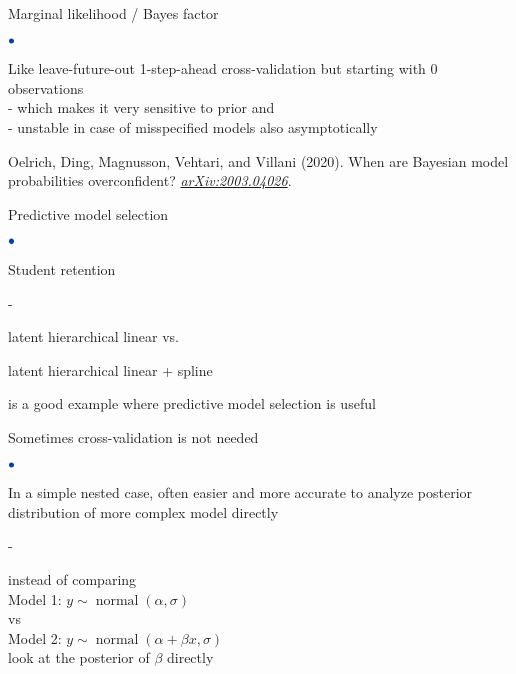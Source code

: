 \documentclass[english,t]{beamer}
\DeclareMathOperator{\normal}{normal}
\newenvironment{list1}{
   \begin{list}{$\color{list1}\bullet$}{\itemsep=6pt}}{
  \end{list}}
\newenvironment{list2}{
  \begin{list}{-}{\baselineskip=12pt\itemsep=2pt}}{
  \end{list}}
\begin{document}
\begin{frame}{Marginal likelihood / Bayes factor}

\vspace{-0.3\baselineskip}
\begin{list1}
\item Like leave-future-out 1-step-ahead cross-validation but starting with 0 observations\\
  {- which makes it very sensitive to prior}
  {and \\- unstable in case of misspecified
    models}{ also asymptotically}
\item Oelrich, Ding, Magnusson, Vehtari, and Villani (2020). When are Bayesian model probabilities overconfident? \textit{\href{https://arxiv.org/abs/2003.04026}{arXiv:2003.04026}}.
  
\end{list1}

\end{frame}

\begin{frame}{Predictive model selection}

  \begin{list1}
  \item Student retention
    \begin{list2}
      \item latent hierarchical linear vs.
      \item latent hierarchical linear + spline
      \end{list2}
      is a good example where predictive model selection is useful
  \end{list1}

\end{frame}

\begin{frame}{Sometimes cross-validation is not needed}

\begin{list1}
\item<+-> In a simple nested case, often easier and more accurate to
  analyze posterior distribution of more complex model directly
  \begin{list2}
  \item instead of comparing\\
    \vspace{0.2\baselineskip}
    Model 1: $y \sim \normal(\alpha, \sigma)$\\
    \vspace{0.2\baselineskip}
    vs\\
    \vspace{0.2\baselineskip}
    Model 2: $y \sim \normal(\alpha + \beta x, \sigma)$\\
    \vspace{0.2\baselineskip}
    look at the posterior of $\beta$ directly
  \end{list2}
\end{list1}

\end{frame}
\end{document}
